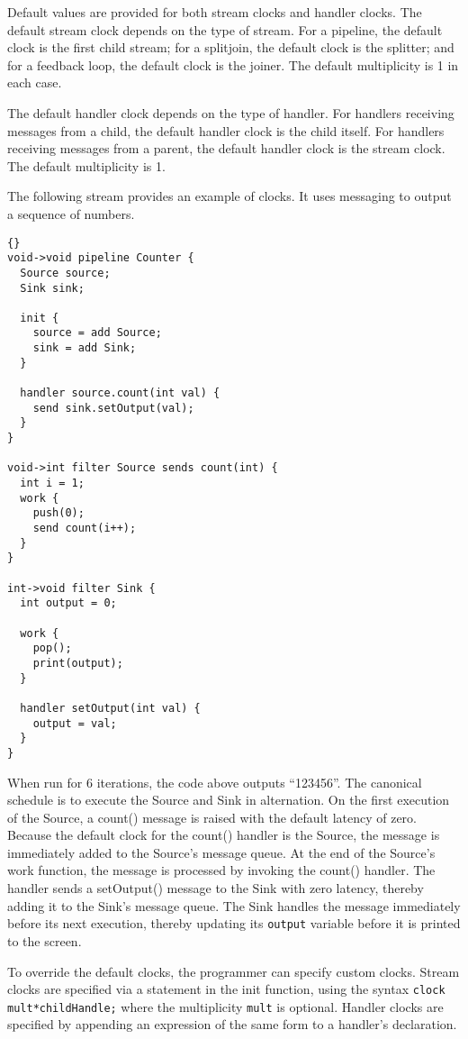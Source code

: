 Default values are provided for both stream clocks and handler clocks.
The default stream clock depends on the type of stream.  For a
pipeline, the default clock is the first child stream; for a
splitjoin, the default clock is the splitter; and for a feedback loop,
the default clock is the joiner.  The default multiplicity is 1 in
each case.

The default handler clock depends on the type of handler.  For
handlers receiving messages from a child, the default handler clock is
the child itself.  For handlers receiving messages from a parent, the
default handler clock is the stream clock.  The default multiplicity
is 1.

The following stream provides an example of clocks.  It uses messaging
to output a sequence of numbers.

\begin{lstlisting}{}
void->void pipeline Counter {
  Source source;
  Sink sink;

  init {
    source = add Source;
    sink = add Sink;
  }

  handler source.count(int val) {
    send sink.setOutput(val);
  }
}

void->int filter Source sends count(int) {
  int i = 1;
  work {
    push(0);
    send count(i++);
  }
}

int->void filter Sink {
  int output = 0;

  work {
    pop();
    print(output);
  }

  handler setOutput(int val) {
    output = val;
  }
}
\end{lstlisting}{}

When run for 6 iterations, the code above outputs ``123456''.  The
canonical schedule is to execute the Source and Sink in alternation.
On the first execution of the Source, a count() message is raised with
the default latency of zero.  Because the default clock for the
count() handler is the Source, the message is immediately added to the
Source's message queue.  At the end of the Source's work function, the
message is processed by invoking the count() handler.  The handler
sends a setOutput() message to the Sink with zero latency, thereby
adding it to the Sink's message queue.  The Sink handles the message
immediately before its next execution, thereby updating its
\lstinline|output| variable before it is printed to the screen.

To override the default clocks, the programmer can specify custom
clocks.  Stream clocks are specified via a statement in the init
function, using the syntax \lstinline|clock mult*childHandle;| where
the multiplicity \lstinline|mult| is optional.  Handler clocks are
specified by appending an expression of the same form to a handler's
declaration.

